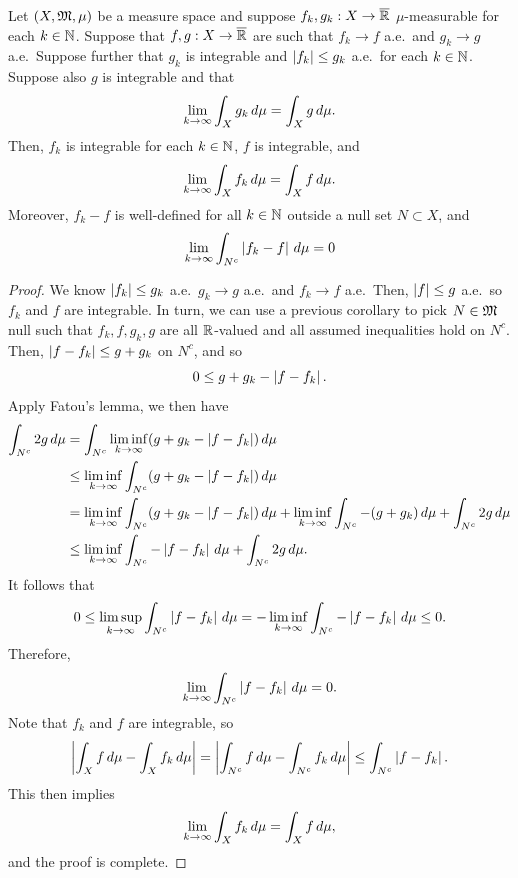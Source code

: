 \documentclass[a4paper]{article}
\begin{document}
\begin{thm}
  Let $(X, \mathfrak{M}, \mu)$ be a measure space and suppose
  $f_k, g_k : X \to \overline{\mathbb{R}}$ $\mu$-measurable for each
  $k \in \mathbb{N}$. Suppose that $f, g: X \to \overline{\mathbb{R}}$ are such that
  $f_k \to f$ a.e.\ and $g_k \to g$ a.e.\ Suppose further that
  $g_k$ is integrable and $\left\lvert f_k\right\rvert \leq g_k$ a.e.\
  for each $k \in \mathbb{N}$. Suppose also $g$ is integrable and that
  \[
    \lim_{k \to \infty} \int_X g_k \, d \mu =
    \int_X g \, d \mu.
  \]
  Then, $f_k$ is integrable for each $k \in \mathbb{N}$, $f$ is integrable, and
  \[
    \lim_{k \to \infty} \int_X f_k \, d \mu = \int_X f \, d \mu.
  \]
  Moreover, $f_k - f$ is well-defined for all $k \in \mathbb{N}$ outside a null
  set $N \subset X$, and
  \[
    \lim_{k \to \infty} \int_{N^c} \left\lvert f_k - f\right\rvert \, d \mu = 0
  \]
\end{thm}

\begin{proof}
  We know $\left\lvert f_k\right\rvert \leq g_k$ a.e.\, $g_k \to g$ a.e.\, and $f_k \to f$
  a.e.\ Then, $\left\lvert f\right\rvert \leq g$ a.e.\, so $f_k$ and $f$ are integrable. In
  turn, we can use a previous corollary to pick $N \in \mathfrak{M}$ null such that
  $f_k, f, g_k, g$ are all $\mathbb{R}$-valued and all assumed inequalities hold
  on $N^c$. Then, $\left\lvert f - f_k\right\rvert \leq g + g_k$ on $N^c$, and so
  \[
    0 \leq g + g_k - \left\lvert f - f_k\right\rvert.
  \]
  Apply Fatou's lemma, we then have
  \[
    \begin{aligned}
      \int_{N^c} 2g \, d \mu
       & = \int_{N^c} \liminf_{k \to \infty} (g + g_k - \left\lvert f - f_k\right\rvert)
      \, d \mu                                                              \\
       & \leq \liminf_{k \to \infty} \int_{N^c} (g + g_k - \left\lvert f - f_k\right\rvert)
      \, d \mu                                                              \\
       & = \liminf_{k \to \infty} \int_{N^c} (g + g_k - \left\lvert f - f_k\right\rvert)
      \, d \mu + \liminf_{k \to \infty} \int_{N^c} -(g + g_k) \, d \mu
      + \int_{N^c} 2g \, d \mu                                              \\
       & \leq \liminf_{k \to \infty} \int_{N^c} - \left\lvert f - f_k\right\rvert \, d \mu
      + \int_{N^c} 2g \, d \mu.
    \end{aligned}
  \]
  It follows that
  \[
    0 \leq \limsup_{k \to \infty} \int_{N^c} \left\lvert f - f_k\right\rvert \, d \mu
    = - \liminf_{k \to \infty} \int_{N^c} - \left\lvert f - f_k\right\rvert \, d \mu
    \leq 0.
  \]
  Therefore,
  \[
    \lim_{k \to \infty} \int_{N^c} \left\lvert f - f_k\right\rvert \, d \mu = 0.
  \]
  Note that $f_k$ and $f$ are integrable, so
  \[
    \left\lvert \int_X f \, d \mu - \int_X f_k \, d \mu\right\rvert
    = \left\lvert \int_{N^c} f \, d \mu - \int_{N^c} f_k \, d \mu\right\rvert
    \leq \int_{N^c} \left\lvert f - f_k\right\rvert.
  \]
  This then implies
  \[
    \lim_{k \to \infty} \int_X f_k \, d \mu = \int_X f \, d \mu,
  \]
  and the proof is complete.
\end{proof}
\end{document}
